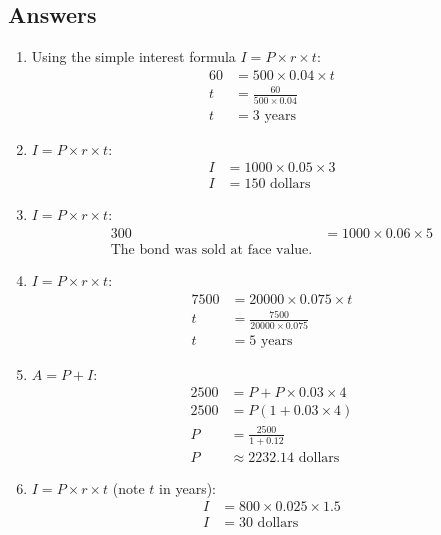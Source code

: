 \documentclass{article}
\begin{document}
\subsection*{Answers}
\begin{enumerate}
  \item Using the simple interest formula \( I = P \times r \times t \):
  \begin{align*}
  60 &= 500 \times 0.04 \times t \\
  t &= \frac{60}{500 \times 0.04} \\
  t &= 3 \text{ years}
  \end{align*}
  \vspace{1cm}
  
  \item \( I = P \times r \times t \):
  \begin{align*}
  I &= 1000 \times 0.05 \times 3 \\
  I &= 150 \text{ dollars}
  \end{align*}
  \vspace{1cm}
  
  \item \( I = P \times r \times t \):
  \begin{align*}
  300 &= 1000 \times 0.06 \times 5 \\
  \text{The bond was sold at face value.}
  \end{align*}
  \vspace{1cm}
  
  \item \( I = P \times r \times t \):
  \begin{align*}
  7500 &= 20000 \times 0.075 \times t \\
  t &= \frac{7500}{20000 \times 0.075} \\
  t &= 5 \text{ years}
  \end{align*}
  \vspace{1cm}
  
  \item \( A = P + I \):
  \begin{align*}
  2500 &= P + P \times 0.03 \times 4 \\
  2500 &= P(1 + 0.03 \times 4) \\
  P &= \frac{2500}{1 + 0.12} \\
  P &\approx 2232.14 \text{ dollars}
  \end{align*}
  \vspace{1cm}
  
  \item \( I = P \times r \times t \) (note \( t \) in years):
  \begin{align*}
  I &= 800 \times 0.025 \times 1.5 \\
  I &= 30 \text{ dollars}
  \end{align*}
  \vspace{1cm}
  

\end{enumerate}
\end{document}
